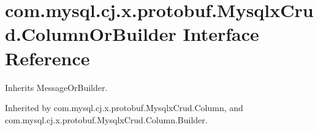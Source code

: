 \hypertarget{interfacecom_1_1mysql_1_1cj_1_1x_1_1protobuf_1_1_mysqlx_crud_1_1_column_or_builder}{}\section{com.\+mysql.\+cj.\+x.\+protobuf.\+Mysqlx\+Crud.\+Column\+Or\+Builder Interface Reference}
\label{interfacecom_1_1mysql_1_1cj_1_1x_1_1protobuf_1_1_mysqlx_crud_1_1_column_or_builder}


Inherits Message\+Or\+Builder.



Inherited by com.\+mysql.\+cj.\+x.\+protobuf.\+Mysqlx\+Crud.\+Column, and com.\+mysql.\+cj.\+x.\+protobuf.\+Mysqlx\+Crud.\+Column.\+Builder.

